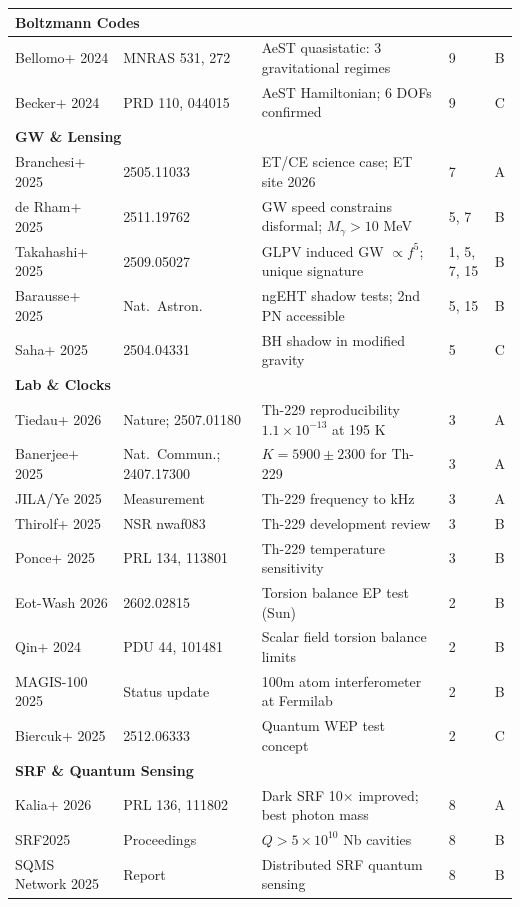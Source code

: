 \documentclass[11pt,a4paper]{article}
\begin{document}
\begin{longtable}{p{2.5cm}p{2.5cm}p{4.5cm}p{1.5cm}c}
\multicolumn{5}{l}{\textbf{Boltzmann Codes}} \\
\midrule
Bellomo+ 2024 & MNRAS 531, 272 & AeST quasistatic: 3 gravitational regimes & 9 & B \\
Becker+ 2024 & PRD 110, 044015 & AeST Hamiltonian; 6 DOFs confirmed & 9 & C \\
\midrule

\multicolumn{5}{l}{\textbf{GW \& Lensing}} \\
\midrule
Branchesi+ 2025 & 2505.11033 & ET/CE science case; ET site 2026 & 7 & A \\
de Rham+ 2025 & 2511.19762 & GW speed constrains disformal; $M_\gamma > 10$ MeV & 5, 7 & B \\
Takahashi+ 2025 & 2509.05027 & GLPV induced GW $\propto f^5$; unique signature & 1, 5, 7, 15 & B \\
Barausse+ 2025 & Nat.\ Astron. & ngEHT shadow tests; 2nd PN accessible & 5, 15 & B \\
Saha+ 2025 & 2504.04331 & BH shadow in modified gravity & 5 & C \\
\midrule

\multicolumn{5}{l}{\textbf{Lab \& Clocks}} \\
\midrule
Tiedau+ 2026 & Nature; 2507.01180 & Th-229 reproducibility $1.1\times10^{-13}$ at 195 K & 3 & A \\
Banerjee+ 2025 & Nat.\ Commun.; 2407.17300 & $K = 5900\pm2300$ for Th-229 & 3 & A \\
JILA/Ye 2025 & Measurement & Th-229 frequency to kHz & 3 & A \\
Thirolf+ 2025 & NSR nwaf083 & Th-229 development review & 3 & B \\
Ponce+ 2025 & PRL 134, 113801 & Th-229 temperature sensitivity & 3 & B \\
Eot-Wash 2026 & 2602.02815 & Torsion balance EP test (Sun) & 2 & B \\
Qin+ 2024 & PDU 44, 101481 & Scalar field torsion balance limits & 2 & B \\
MAGIS-100 2025 & Status update & 100m atom interferometer at Fermilab & 2 & B \\
Biercuk+ 2025 & 2512.06333 & Quantum WEP test concept & 2 & C \\
\midrule

\multicolumn{5}{l}{\textbf{SRF \& Quantum Sensing}} \\
\midrule
Kalia+ 2026 & PRL 136, 111802 & Dark SRF 10$\times$ improved; best photon mass & 8 & A \\
SRF2025 & Proceedings & $Q > 5\times10^{10}$ Nb cavities & 8 & B \\
SQMS Network 2025 & Report & Distributed SRF quantum sensing & 8 & B \\
\midrule


\end{longtable}
\end{document}
